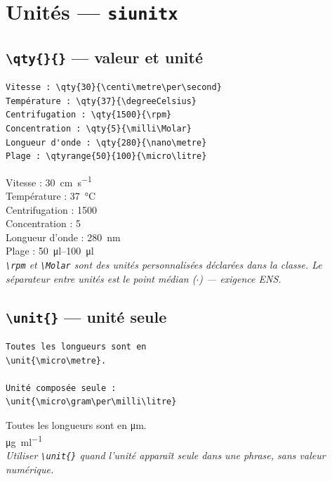 \documentclass[12pt, a4paper]{article}
\begin{document}
\section{Unités — \texttt{siunitx}}

\subsection{\texttt{\textbackslash qty\{\}\{\}} — valeur et unité}

\begin{demo}
\begin{lstlisting}[style=latexcode]
Vitesse : \qty{30}{\centi\metre\per\second}
Température : \qty{37}{\degreeCelsius}
Centrifugation : \qty{1500}{\rpm}
Concentration : \qty{5}{\milli\Molar}
Longueur d'onde : \qty{280}{\nano\metre}
Plage : \qtyrange{50}{100}{\micro\litre}
\end{lstlisting}
\tcblower
Vitesse : \qty{30}{\centi\metre\per\second}\\
Température : \qty{37}{\degreeCelsius}\\
Centrifugation : \qty{1500}{\rpm}\\
Concentration : \qty{5}{\milli\Molar}\\
Longueur d'onde : \qty{280}{\nano\metre}\\
Plage : \qtyrange{50}{100}{\micro\litre}\\[6pt]
{\footnotesize\itshape \texttt{\textbackslash rpm} et \texttt{\textbackslash Molar} sont des unités personnalisées déclarées dans la classe. Le séparateur entre unités est le point médian ($\cdot$) — exigence ENS.}
\end{demo}

\subsection{\texttt{\textbackslash unit\{\}} — unité seule}

\begin{demo}
\begin{lstlisting}[style=latexcode]
Toutes les longueurs sont en
\unit{\micro\metre}.

Unité composée seule :
\unit{\micro\gram\per\milli\litre}
\end{lstlisting}
\tcblower
Toutes les longueurs sont en \unit{\micro\metre}.\\[6pt]
\unit{\micro\gram\per\milli\litre}\\[6pt]
{\footnotesize\itshape Utiliser \texttt{\textbackslash unit\{\}} quand l'unité apparaît seule dans une phrase, sans valeur numérique.}
\end{demo}
\end{document}
